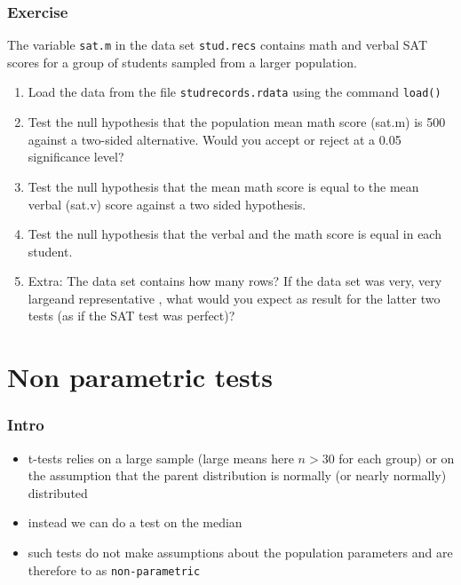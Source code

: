 \documentclass[xcolor={table}]{beamer}
\begin{document}
\begin{frame}[fragile]\frametitle{Exercise}
  The variable \texttt{sat.m} in the data set \texttt{stud.recs} contains math and verbal SAT scores for a group of students sampled from a larger population. 
  \begin{enumerate}
  \item Load the data from the file \texttt{studrecords.rdata} using the command \texttt{load()}
  \item Test the null hypothesis that the population mean math score (sat.m) is 500 against a two-sided alternative. Would you accept or reject at a 0.05 significance level?
  \item Test the null hypothesis that the mean math score is equal to the mean verbal (sat.v) score against a two sided hypothesis.
  \item Test the null hypothesis that the verbal and the math score is equal in each student.
  \item Extra: The data set contains how many rows? If the data set was very, very largeand representative , what would you expect as result for the latter two tests (as if the SAT test was perfect)?
  \end{enumerate}
\end{frame}

\section{Non parametric tests}

\begin{frame}\frametitle{Intro}
  \begin{itemize}
  \item t-tests relies on a large sample (large means here $n > 30$ for each group) or on the assumption that the parent distribution is normally (or nearly normally) distributed
  \item instead we can do a test on the median
  \item such tests do not make assumptions about the population parameters and are therefore to as \texttt{non-parametric}
  \end{itemize}
\end{frame} 
\end{document}
